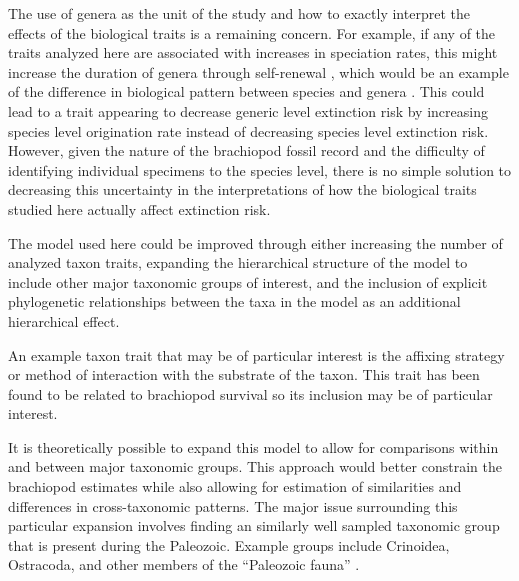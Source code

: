\documentclass{article}
\begin{document}
The use of genera as the unit of the study and how to exactly interpret the effects of the biological traits is a remaining concern. For example, if any of the traits analyzed here are associated with increases in speciation rates, this might increase the duration of genera through self-renewal \citep{Raup1991b,Raup1994}, which would be an example of the difference in biological pattern between species and genera \citep{Jablonski1987,Jablonski2007,Jablonski2008a}. This could lead to a trait appearing to decrease generic level extinction risk by increasing species level origination rate instead of decreasing species level extinction risk. However, given the nature of the brachiopod fossil record and the difficulty of identifying individual specimens to the species level, there is no simple solution to decreasing this uncertainty in the interpretations of how the biological traits studied here actually affect extinction risk.

The model used here could be improved through either increasing the number of analyzed taxon traits, expanding the hierarchical structure of the model to include other major taxonomic groups of interest, and the inclusion of explicit phylogenetic relationships between the taxa in the model as an additional hierarchical effect.

An example taxon trait that may be of particular interest is the affixing strategy or method of interaction with the substrate of the taxon. This trait has been found to be related to brachiopod survival \citep{Alexander1977} so its inclusion may be of particular interest.

It is theoretically possible to expand this model to allow for comparisons within and between major taxonomic groups. This approach would better constrain the brachiopod estimates while also allowing for estimation of similarities and differences in cross-taxonomic patterns. The major issue surrounding this particular expansion involves finding an similarly well sampled taxonomic group that is present during the Paleozoic. Example groups include Crinoidea, Ostracoda, and other members of the ``Paleozoic fauna'' \citep{SepkoskiJr.1981a}.
\end{document}
